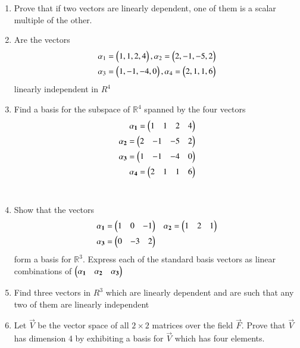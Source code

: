 \renewcommand{\theequation}{\theenumi}
\renewcommand{\thefigure}{\theenumi}
\begin{enumerate}[label=\thesubsection.\arabic*.,ref=\thesubsection.\theenumi]
\item Prove that if two vectors are linearly dependent, one of them is a scalar multiple of the other.
%
\\
\solution

%
\item Are the vectors 
\begin{align}
\alpha{_1}=\begin{pmatrix}1,1,2,4\end{pmatrix} , \alpha{_2}=\begin{pmatrix}2,-1,-5,2\end{pmatrix} \\
\alpha{_3}=\begin{pmatrix}1,-1,-4,0\end{pmatrix} , \alpha{_4}=\begin{pmatrix}2,1,1,6\end{pmatrix}
\end{align}
linearly independent in $R^{4}$
%
\\
\solution

%
\item Find a basis for the subspace of $\mathbb{R}^{4}$ spanned by the four vectors
\begin{align}
\mathbf{\alpha_1} = \begin{pmatrix}1&1&2&4\end{pmatrix}\\
\mathbf{\alpha_2} = \begin{pmatrix}2&-1&-5&2\end{pmatrix}\\
\mathbf{\alpha_3} = \begin{pmatrix}1&-1&-4&0\end{pmatrix}\\
\mathbf{\alpha_4} = \begin{pmatrix}2&1&1&6\end{pmatrix}
\end{align}
%
\\
\solution

\item Show that the vectors 
\begin{align}
& \mathbf{\alpha_1} = \begin{pmatrix}1 & 0 & -1\end{pmatrix} & \mathbf{\alpha_2} = \begin{pmatrix}1 & 2 & 1 \end{pmatrix} \\
& \mathbf{\alpha_3} = \begin{pmatrix}0 & -3 & 2\end{pmatrix}
\end{align}
form a basis for $\mathbb{R}^3$. Express each of the standard basis vectors as linear combinations
of $\begin{pmatrix}\mathbf{\alpha_1} &  \mathbf{\alpha_2} & \mathbf{\alpha_3}\end{pmatrix}$
\\
\solution

\item Find three vectors in $R^{3}$ which are linearly dependent and are such that any two of them are linearly independent
%
\\
\solution

%
\item 	Let $\vec{V}$ be the vector space of all $2\times 2$ matrices over the field $\vec{F}$. Prove that $\vec{V}$ has dimension 4 by exhibiting a basis for $\vec{V}$ which has four elements.

\end{enumerate}
